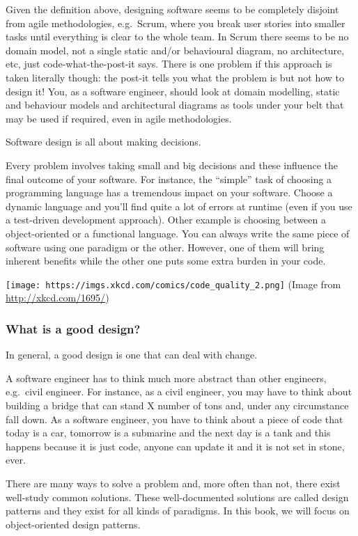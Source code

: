 \documentclass[]{article}
\begin{document}
Given the definition above, designing software seems to be completely
disjoint from agile methodologies, e.g.~Scrum, where you break user
stories into smaller tasks until everything is clear to the whole team.
In Scrum there seems to be no domain model, not a single static and/or
behavioural diagram, no architecture, etc, just code-what-the-post-it
says. There is one problem if this approach is taken literally though:
the post-it tells you what the problem is but not how to design it! You,
as a software engineer, should look at domain modelling, static and
behaviour models and architectural diagrams as tools under your belt
that may be used if required, even in agile methodologies.

Software design is all about making decisions.

Every problem involves taking small and big decisions and these
influence the final outcome of your software. For instance, the
``simple'' task of choosing a programming language has a tremendous
impact on your software. Choose a dynamic language and you'll find quite
a lot of errors at runtime (even if you use a test-driven development
approach). Other example is choosing between a object-oriented or a
functional language. You can always write the same piece of software
using one paradigm or the other. However, one of them will bring
inherent benefits while the other one puts some extra burden in your
code.

\texttt{[image: https://imgs.xkcd.com/comics/code\_quality\_2.png]} (Image
from \url{http://xkcd.com/1695/})

\subsubsection{What is a good design?}\label{what-is-a-good-design}

In general, a good design is one that can deal with change.

A software engineer has to think much more abstract than other
engineers, e.g.~civil engineer. For instance, as a civil engineer, you
may have to think about building a bridge that can stand X number of
tons and, under any circumstance fall down. As a software engineer, you
have to think about a piece of code that today is a car, tomorrow is a
submarine and the next day is a tank and this happens because it is just
code, anyone can update it and it is not set in stone, ever.

There are many ways to solve a problem and, more often than not, there
exist well-study common solutions. These well-documented solutions are
called design patterns and they exist for all kinds of paradigms. In
this book, we will focus on object-oriented design patterns.
\end{document}
